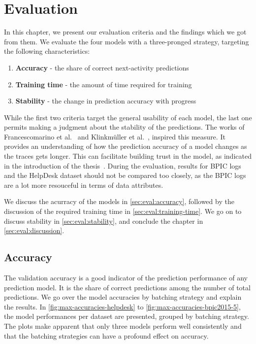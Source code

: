 \chapter{Evaluation}\label{chap:evaluation}
In this chapter, we present our evaluation criteria and the findings which we got from them.
We evaluate the four models with a three-pronged strategy, targeting the following characteristics:

\begin{enumerate}
    \item\textbf{Accuracy} - the share of correct next-activity predictions
    \item\textbf{Training time} - the amount of time required for training
    \item\textbf{Stability} - the change in prediction accuracy with progress
\end{enumerate}

While the first two criteria target the general usability of each model, the last one permits making a judgment about the stability of the predictions. The works of Francescomarino et al.~\cite{francescomarino2015} and Klinkmüller et al.~\cite{klinkmuller2018reliablemonitoring}, inspired this measure. It provides an understanding of how the prediction accuracy of a model changes as the traces gets longer. This can facilitate building trust in the model, as indicated in the introduction of the thesis~\cite{klinkmuller2018reliablemonitoring, boehmer2018probability}.
During the evaluation, results for BPIC logs and the HelpDesk dataset should not be compared too closely, as the BPIC logs are a lot more resouceful in terms of data attributes.

We discuss the acurracy of the models in \autoref{sec:eval:accuracy}, followed by the discussion of the required training time in \autoref{sec:eval:training-time}. We go on to discuss stability in \autoref{sec:eval:stability}, and conclude the chapter in \autoref{sec:eval:discussion}.

\section{Accuracy}\label{sec:eval:accuracy}
The validation accuracy is a good indicator of the prediction performance of any prediction model. It is the share of correct predictions among the number of total predictions. We go over the model accuracies by batching strategy and explain the results. In \autoref{fig:max-accuracies-helpdesk} to \autoref{fig:max-accuracies-bpic2015-5}, the model performances per dataset are presented, grouped by batching strategy. The plots make apparent that only three models perform well consistently and that the batching strategies can have a profound effect on accuracy.\\

